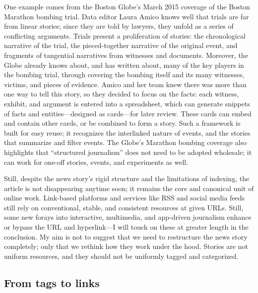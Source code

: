 One example comes from the Boston Globe's March 2015 coverage of the Boston Marathon bombing trial. Data editor Laura Amico knows well that trials are far from linear stories; since they are told by lawyers, they unfold as a series of conflicting arguments. Trials present a proliferation of stories: the chronological narrative of the trial, the pieced-together narrative of the original event, and fragments of tangential narratives from witnesses and documents. Moreover, the Globe already knows about, and has written about, many of the key players in the bombing trial, through covering the bombing itself and its many witnesses, victims, and pieces of evidence. Amico and her team knew there was more than one way to tell this story, so they decided to focus on the facts: each witness, exhibit, and argument is entered into a spreadsheet, which can generate snippets of facts and entities---designed as cards---for later review.\autocite{mullin_how_2015} These cards can embed and contain other cards, or be combined to form a story. Such a framework is built for easy reuse; it recognizes the interlinked nature of events, and the stories that summarize and filter events. The Globe's Marathon bombing coverage also highlights that ``structured journalism'' does not need to be adopted wholesale; it can work for one-off stories, events, and experiments as well.

Still, despite the news story's rigid structure and the limitations of indexing, the article is not disappearing anytime soon; it remains the core and canonical unit of online work. Link-based platforms and services like RSS and social media feeds still rely on conventional, stable, and consistent resources at given URLs. Still, some new forays into interactive, multimedia, and app-driven journalism enhance or bypass the URL and hyperlink---I will touch on these at greater length in the conclusion. My aim is not to suggest that we need to restructure the news story completely; only that we rethink how they work under the hood. Stories are not uniform resources, and they should not be uniformly tagged and categorized.

\subsection{From tags to links}

